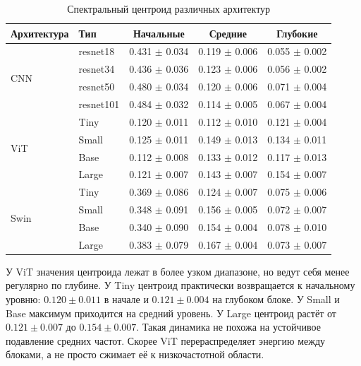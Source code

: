 \begin{table}[h]
\centering
\caption{Спектральный центроид различных архитектур} 
\label{tab:SpectraCentr_metrics}
\vspace{1ex} 
\begin{tabular}{llccc}
\toprule
\textbf{Архитектура} & \textbf{Тип} & \textbf{Начальные} & \textbf{Средние} & \textbf{Глубокие} \\
\midrule

\multirow{4}{*}{CNN} & resnet18      & 0.431 $\pm$ 0.034 & 0.119 $\pm$ 0.006 & 0.055 $\pm$ 0.002 \\
                     & resnet34      & 0.436 $\pm$ 0.036 & 0.123 $\pm$ 0.006 & 0.056 $\pm$ 0.002 \\
                     & resnet50      & 0.480 $\pm$ 0.034 & 0.120 $\pm$ 0.006 & 0.071 $\pm$ 0.004 \\
                     & resnet101     & 0.484 $\pm$ 0.032 & 0.114 $\pm$ 0.005 & 0.067 $\pm$ 0.004 \\

\midrule

\multirow{4}{*}{ViT} & Tiny      & 0.120 $\pm$ 0.011 & 0.112 $\pm$ 0.010 & 0.121 $\pm$ 0.004 \\
                     & Small     & 0.125 $\pm$ 0.011 & 0.149 $\pm$ 0.013 & 0.134 $\pm$ 0.011 \\
                     & Base      & 0.112 $\pm$ 0.008 & 0.133 $\pm$ 0.012 & 0.117 $\pm$ 0.013 \\
                     & Large     & 0.121 $\pm$ 0.007 & 0.143 $\pm$ 0.007 & 0.154 $\pm$ 0.007 \\
\midrule

\multirow{4}{*}{Swin} & Tiny       & 0.369 $\pm$ 0.086 & 0.124 $\pm$ 0.007 & 0.075 $\pm$ 0.006 \\
                      & Small      & 0.348 $\pm$ 0.091 & 0.156 $\pm$ 0.005 & 0.072 $\pm$ 0.007 \\
                      & Base       & 0.340 $\pm$ 0.090 & 0.154 $\pm$ 0.004 & 0.078 $\pm$ 0.010 \\
                      & Large      & 0.383 $\pm$ 0.079 & 0.167 $\pm$ 0.004 & 0.073 $\pm$ 0.007 \\
\bottomrule
\end{tabular}
\end{table}

У ViT значения центроида лежат в более узком диапазоне, но ведут себя менее регулярно по глубине. У Tiny центроид практически возвращается к начальному уровню: $0.120\pm0.011$ в начале и $0.121\pm0.004$ на глубоком блоке. У Small и Base максимум приходится на средний уровень. У Large центроид растёт от $0.121\pm0.007$ до $0.154\pm0.007$. Такая динамика не похожа на устойчивое подавление средних частот. Скорее ViT перераспределяет энергию между блоками, а не просто сжимает её к низкочастотной области.

